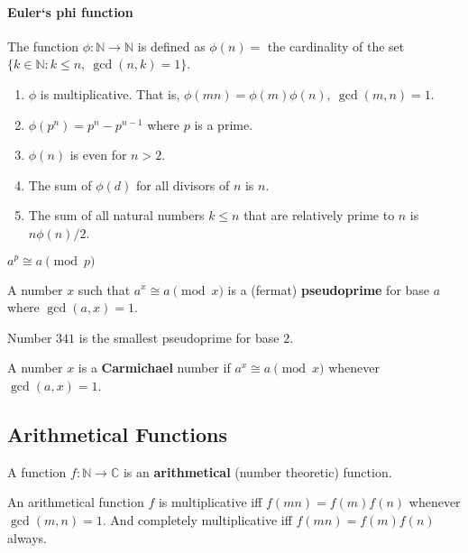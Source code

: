 \paragraph{Euler`s phi function}
	The function $\phi : \mathbb{N} \to \mathbb{N}$ is defined as $\phi(n) = $ the cardinality of the set $\{k \in \mathbb{N} : k \le n,\ \gcd(n,k)=1\}$.

	\begin{enumerate}
		\item $\phi$ is multiplicative. That is, $\phi(mn) = \phi(m)\phi(n),\ \gcd(m,n)=1$.
		\item $\phi(p^n) = p^n-p^{n-1}$ where $p$ is a prime.
		\item $\phi(n)$ is even for $n > 2$.
		\item The sum of $\phi(d)$ for all divisors of $n$ is $n$.
		\item The sum of all natural numbers $k \le n$ that are relatively prime to $n$ is $n\phi(n)/2$.
	\end{enumerate}

\begin{theorem}[Fermat]
	$a^p \cong a \pmod{p}$
\end{theorem}
\begin{definition}
	A number $x$ such that $a^x \cong a \pmod{x}$ is a (fermat) \textbf{pseudoprime} for base $a$ where $\gcd(a,x) = 1$.
\end{definition}
Number $341$ is the smallest pseudoprime for base $2$.

\begin{definition}
	A number $x$ is a \textbf{Carmichael} number if $a^x \cong a \pmod{x}$ whenever $\gcd(a,x)=1$.
\end{definition}

\subsection{Arithmetical Functions}
\begin{definition}
	A function $f : \mathbb{N} \to \mathbb{C}$ is an \textbf{arithmetical} (number theoretic) function.
\end{definition}

\begin{definition}
	An arithmetical function $f$ is multiplicative iff $f(mn) = f(m)f(n)$ whenever $\gcd(m,n) = 1$.
	And completely multiplicative iff $f(mn) = f(m)f(n)$ always.
\end{definition}

